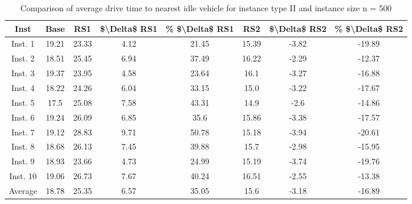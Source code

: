 \begin{table}[H]
\centering
\begin{tabular}{cccccccc}
  \hline
  \textbf{Inst} & \textbf{Base} & \textbf{RS1} & \textbf{\$\textbackslash{}Delta\$  RS1} & \textbf{\% \$\textbackslash{}Delta\$  RS1} & \textbf{RS2} & \textbf{\$\textbackslash{}Delta\$  RS2} & \textbf{\% \$\textbackslash{}Delta\$  RS2} \\\hline
  Inst. 1 & 19.21 & 23.33 & 4.12 & 21.45 & 15.39 & -3.82 & -19.89 \\
  Inst. 2 & 18.51 & 25.45 & 6.94 & 37.49 & 16.22 & -2.29 & -12.37 \\
  Inst. 3 & 19.37 & 23.95 & 4.58 & 23.64 & 16.1 & -3.27 & -16.88 \\
  Inst. 4 & 18.22 & 24.26 & 6.04 & 33.15 & 15.0 & -3.22 & -17.67 \\
  Inst. 5 & 17.5 & 25.08 & 7.58 & 43.31 & 14.9 & -2.6 & -14.86 \\
  Inst. 6 & 19.24 & 26.09 & 6.85 & 35.6 & 15.86 & -3.38 & -17.57 \\
  Inst. 7 & 19.12 & 28.83 & 9.71 & 50.78 & 15.18 & -3.94 & -20.61 \\
  Inst. 8 & 18.68 & 26.13 & 7.45 & 39.88 & 15.7 & -2.98 & -15.95 \\
  Inst. 9 & 18.93 & 23.66 & 4.73 & 24.99 & 15.19 & -3.74 & -19.76 \\
  Inst. 10 & 19.06 & 26.73 & 7.67 & 40.24 & 16.51 & -2.55 & -13.38 \\
  Average & 18.78 & 25.35 & 6.57 & 35.05 & 15.6 & -3.18 & -16.89 \\\hline
\end{tabular}
\caption{Comparison of average drive time to nearest idle vehicle for instance type II and instance size n = 500}
\label{tab:wait:resrelocation-nearest-drive-time-comparison_II_500}
\end{table}
